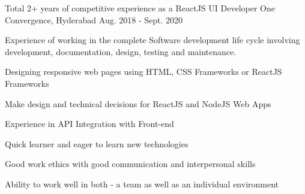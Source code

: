 \begin{cventries}
  \cventry
    {}
    {Total 2+ years of competitive experience as a ReactJS UI Developer}
    {One Convergence, Hyderabad}
    {Aug. 2018 - Sept. 2020}
    {
      \begin{cvitems}
        \item {Experience of working in the complete Software development life cycle involving development, documentation, design, testing and maintenance.}
        \item {Designing responsive web pages using HTML, CSS Frameworks or ReactJS Frameworks}
        \item {Make design and technical decisions for ReactJS and NodeJS Web Apps}
        \item {Experience in API Integration with Front-end}
        \item {Quick learner and eager to learn new technologies}
        \item {Good work ethics with good communication and interpersonal skills}
        \item {Ability to work well in both - a team as well as an individual environment}
      \end{cvitems}
    }
\end{cventries}
